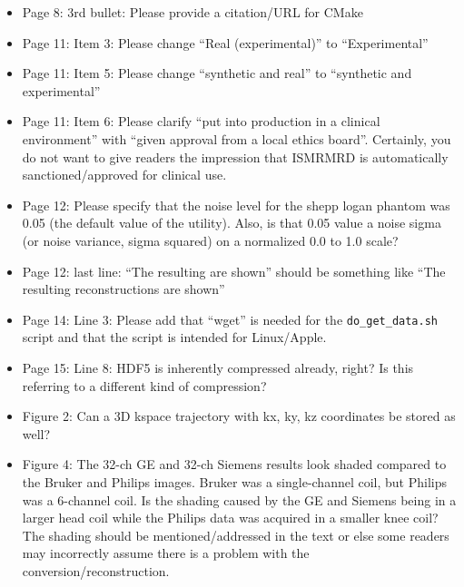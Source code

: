 \documentclass[12pt, draft]{article}
\makeatletter
\def\namedlabel#1#2{\begingroup#2\def\@currentlabel{#2}\phantomsection\label{#1}\endgroup}
\newcommand{\question}[1]{\item[\namedlabel{q#1}{#1}]}
\makeatother
\begin{document}
{\begin{itemize}
\question{R2.20} Page 8: 3rd bullet: Please provide a citation/URL for CMake

\question{R2.21} Page 11: Item 3: Please change ``Real (experimental)'' to ``Experimental''

\question{R2.22} Page 11: Item 5: Please change ``synthetic and real'' to ``synthetic and experimental''

\question{R2.23} Page 11: Item 6: Please clarify ``put into production in a clinical environment'' with ``given approval from a local ethics board''. Certainly, you do not want to give readers the impression that ISMRMRD is automatically sanctioned/approved for clinical use.

\question{R2.24} Page 12: Please specify that the noise level for the shepp logan phantom was 0.05 (the default value of the utility). Also, is that 0.05 value a noise sigma (or noise variance, sigma squared) on a normalized 0.0 to 1.0 scale?

\question{R2.25} Page 12: last line: ``The resulting are shown'' should be something like ``The resulting reconstructions are shown''

\question{R2.26} Page 14: Line 3: Please add that ``wget'' is needed for the \texttt{do\_get\_data.sh} script and that the script is intended for Linux/Apple.

\question{R2.27} Page 15: Line 8: HDF5 is inherently compressed already, right? Is this referring to a different kind of compression?

\question{R2.28} Figure 2: Can a 3D kspace trajectory with kx, ky, kz coordinates be stored as well?

\question{R2.29} Figure 4: The 32-ch GE and 32-ch Siemens results look shaded compared to the Bruker and Philips images. Bruker was a single-channel coil, but Philips was a 6-channel coil. Is the shading caused by the GE and Siemens being in a larger head coil while the Philips data was acquired in a smaller knee coil? The shading should be mentioned/addressed in the text or else some readers may incorrectly assume there is a problem with the conversion/reconstruction.
\end{itemize}

\listofchanges

}%

\newpage
\clearpage
\pagestyle{empty}
\end{document}
